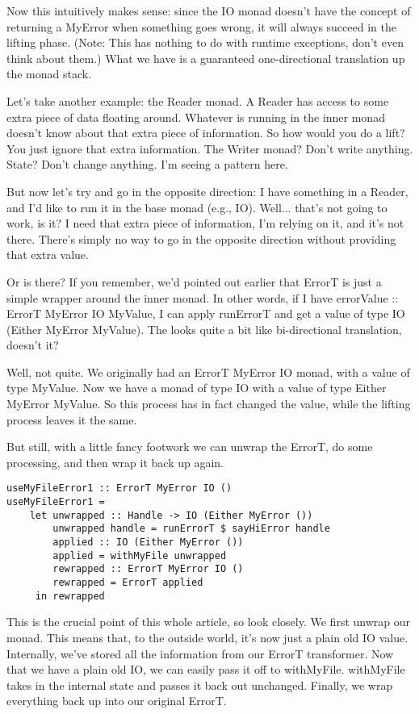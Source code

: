 Now this intuitively makes sense: since the IO monad doesn't have the concept of returning a MyError when something goes wrong, it will always succeed in the lifting phase. (Note: This has nothing to do with runtime exceptions, don't even think about them.) What we have is a guaranteed one-directional translation up the monad stack.

Let's take another example: the Reader monad. A Reader has access to some extra piece of data floating around. Whatever is running in the inner monad doesn't know about that extra piece of information. So how would you do a lift? You just ignore that extra information. The Writer monad? Don't write anything. State? Don't change anything. I'm seeing a pattern here.

But now let's try and go in the opposite direction: I have something in a Reader, and I'd like to run it in the base monad (e.g., IO). Well... that's not going to work, is it? I need that extra piece of information, I'm relying on it, and it's not there. There's simply no way to go in the opposite direction without providing that extra value.

Or is there? If you remember, we'd pointed out earlier that ErrorT is just a simple wrapper around the inner monad. In other words, if I have errorValue :: ErrorT MyError IO MyValue, I can apply runErrorT and get a value of type IO (Either MyError MyValue). The looks quite a bit like bi-directional translation, doesn't it?

Well, not quite. We originally had an ErrorT MyError IO monad, with a value of type MyValue. Now we have a monad of type IO with a value of type Either MyError MyValue. So this process has in fact changed the value, while the lifting process leaves it the same.

But still, with a little fancy footwork we can unwrap the ErrorT, do some processing, and then wrap it back up again.

\begin{lstlisting}
useMyFileError1 :: ErrorT MyError IO ()
useMyFileError1 =
    let unwrapped :: Handle -> IO (Either MyError ())
        unwrapped handle = runErrorT $ sayHiError handle
        applied :: IO (Either MyError ())
        applied = withMyFile unwrapped
        rewrapped :: ErrorT MyError IO ()
        rewrapped = ErrorT applied
     in rewrapped
\end{lstlisting}

This is the crucial point of this whole article, so look closely. We first unwrap our monad. This means that, to the outside world, it's now just a plain old IO value. Internally, we've stored all the information from our ErrorT transformer. Now that we have a plain old IO, we can easily pass it off to withMyFile. withMyFile takes in the internal state and passes it back out unchanged. Finally, we wrap everything back up into our original ErrorT.

